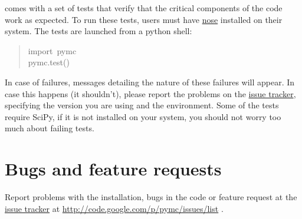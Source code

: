  comes with a set of tests that verify that the critical components
of the code work as expected. To run these tests, users must have \href{http://somethingaboutorange.com/mrl/projects/nose/}{nose}
installed on their system. The tests are launched from a python shell:
\begin{quote}{\ttfamily \raggedright \noindent
import~pymc~\\
pymc.test()
}\end{quote}

In case of failures, messages detailing the nature of these failures will 
appear. In case this happens (it shouldn't), please report
the problems on the \href{http://code.google.com/p/pymc/issues/list.}{issue tracker}, specifying the version you are using and the
environment. Some of the tests require SciPy, if it is not installed on your 
system, you should not worry too much about failing tests.



\hypertarget{bugs-and-feature-requests}{}
\section*{Bugs and feature requests}

Report problems with the installation, bugs in the code or feature request at 
the \href{http://code.google.com/p/pymc/issues/list.}{issue tracker} at \href{http://code.google.com/p/pymc/issues/list}{http://code.google.com/p/pymc/issues/list} .

